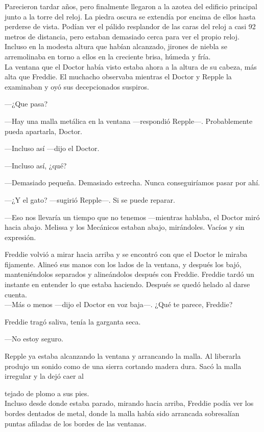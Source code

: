 {Parecieron tardar años, pero finalmente llegaron a la azotea del
	edificio principal junto a la torre del reloj. La piedra oscura se
	extendía por encima de ellos hasta perderse de vista. Podían ver el
	pálido resplandor de las caras del reloj a casi 92 metros de distancia,
	pero estaban demasiado cerca para ver el propio reloj. Incluso en la
	modesta altura que habían alcanzado, jirones de niebla se arremolinaba
	en torno a ellos en la creciente brisa, húmeda y fría.\\
	La ventana que el Doctor había visto estaba ahora a la altura de su
	cabeza, más alta que Freddie. El muchacho observaba mientras el
Doctor y Repple la examinaban y oyó sus decepcionados suspiros.}

{---¿Que pasa?}

{---Hay una malla metálica en la ventana ---respondió
Repple---. Probablemente pueda apartarla, Doctor.}

{---Incluso así ---dijo el Doctor.}

{---Incluso así, ¿qué?}

{---Demasiado pequeña. Demasiado estrecha. Nunca conseguiríamos
pasar por ahí.}

{---¿Y el gato? ---sugirió Repple---. Si se puede reparar.}

{---Eso nos llevaría un tiempo que no tenemos ---mientras hablaba, el
	Doctor miró hacia abajo. Melissa y los Mecánicos estaban abajo,
mirándoles. Vacíos y sin expresión.}

{Freddie volvió a mirar hacia arriba y se encontró con que el Doctor le
	miraba fijamente. Alineó sus manos con los lados de la ventana, y
	después los bajó, manteniéndolos separados y alineándolos después con
	Freddie. Freddie tardó un instante en entender lo que estaba
	haciendo. Después se quedó helado al darse cuenta.\\
	---Más o menos ---dijo el Doctor en voz baja---. ¿Qué te parece,
Freddie?}

{Freddie tragó saliva, tenía la garganta seca.}

{---No estoy seguro.}

{Repple ya estaba alcanzando la ventana y arrancando la malla. Al
	liberarla produjo un sonido como de una sierra cortando madera
dura. Sacó la malla irregular y la dejó caer al}

{tejado de plomo a sus pies.\\
	Incluso desde donde estaba parado, mirando hacia arriba, Freddie podía
	ver los bordes dentados de metal, donde la malla había sido arrancada
sobresalían puntas afiladas de los bordes de las ventanas.}

